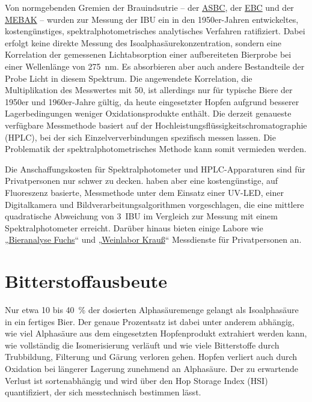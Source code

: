 \documentclass[a4paper,parskip=half]{scrartcl}
\begin{document}
Von normgebenden Gremien der Brauindsutrie – der \href{https://www.asbcnet.org}{ASBC}, der \href{https://europeanbreweryconvention.eu}{EBC} und der \href{https://www.mebak.org}{MEBAK} – wurden zur Messung der IBU ein in den 1950er-Jahren entwickeltes, kostengünstiges, spektralphotometrisches analytisches Verfahren ratifiziert. Dabei erfolgt keine direkte Messung des Isoalphasäurekonzentration, sondern eine Korrelation der gemessenen Lichtabsorption einer aufbereiteten Bierprobe bei einer Wellenlänge von 275~nm. Es absorbieren aber auch andere Bestandteile der Probe Licht in diesem Spektrum. Die angewendete Korrelation, die Multiplikation des Messwertes mit 50, ist allerdings nur für typische Biere der 1950er und 1960er-Jahre gültig, da heute eingesetzter Hopfen aufgrund besserer Lagerbedingungen weniger Oxidationsprodukte enthält. Die derzeit genaueste
verfügbare Messmethode basiert auf der Hochleistungsflüssigkeitschromatographie (HPLC),
bei der sich Einzelververbindungen spezifisch messen lassen. Die Problematik der spektralphotometrisches Methode kann somit vermieden werden. \parencites{ASBC2011}{Hosom2017}[28]{Nottebohm2020}

Die Anschaffungskosten für Spektralphotometer und HPLC-Apparaturen sind für Privatpersonen nur schwer zu decken. \textcite{Calado2019} haben aber eine kostengünstige, auf Fluoreszenz basierte, Messmethode unter dem Einsatz einer UV-LED, einer Digitalkamera und Bildverarbeitungsalgorithmen vorgeschlagen, die eine mittlere quadratische Abweichung von 3~IBU im Vergleich zur Messung mit einem Spektralphotometer erreicht. Darüber hinaus bieten einige Labore wie „\href{https://bieranalyse.de}{Bieranalyse Fuchs}“ und „\href{https://www.weinlabor-krauss.de}{Weinlabor Krauß}“ Messdienste für Privatpersonen an.

\section*{Bitterstoffausbeute}

Nur etwa 10 bis 40~\% der dosierten Alphasäuremenge gelangt als Isoalphasäure in ein fertiges Bier. Der genaue Prozentsatz ist dabei unter anderem abhängig, wie viel Alphasäure aus dem eingesetzten Hopfenprodukt extrahiert werden kann, wie vollständig die Isomerisierung verläuft und wie viele Bitterstoffe durch Trubbildung, Filterung und Gärung verloren gehen. Hopfen verliert auch durch Oxidation bei längerer Lagerung zunehmend an Alphasäure. Der zu erwartende Verlust ist sortenabhängig und wird über den Hop Storage Index (HSI) quantifiziert, der sich messtechnisch bestimmen lässt. \parencites[9]{Malowicki2005}[103\psq]{Garetz1994} 
\end{document}
